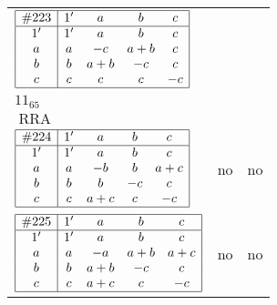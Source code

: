 \documentclass[12pt]{article}
\theoremstyle{definition}
\newcommand\RRA{\operatorname{RRA}}
\newcommand{\join}{\mathbin{+}}%
\newcommand{\id}{{1'}}%
\begin{document}
\begin{center}
\begin{longtable}{l|c|c}
$
\begin{array}{|c|cccc|} \hline
\#223 & \id & a & b & c \\ \hline
\id & \id & a & b & c \\
a & a & -c & a \join b & c \\
b & b & a \join b & -c & c \\
c & c & c & c & -c \\ \hline
\end{array}
$
 & \begin{tabular}{c} yes \\ $11_{65}$ \\ $\RRA$ \end{tabular} 
 & \adjustbox{valign=c, max height=1.6cm}{$
\left[ \begin{array}{cccccc}
\id & a & a & b & c & b \\ 
a & \id & a & a & c & b \\ 
a & a & \id & b & c & b \\ 
b & a & b & \id & c & b \\ 
c & c & c & c & \id & c \\ 
b & b & b & b & c & \id
\end{array}\right]
$}      \\[15mm]

$
\begin{array}{|c|cccc|} \hline
\#224 & \id & a & b & c \\ \hline
\id & \id & a & b & c \\
a & a & -b & b & a \join c \\
b & b & b & -c & c \\
c & c & a \join c & c & -c \\ \hline
\end{array}
$
 & no  
 & no     \\[15mm]

$
\begin{array}{|c|cccc|} \hline
\#225 & \id & a & b & c \\ \hline
\id & \id & a & b & c \\
a & a & -a & a \join b & a \join c \\
b & b & a \join b & -c & c \\
c & c & a \join c & c & -c \\ \hline
\end{array}
$
 & no  
 & no      \\[15mm]


\end{longtable}
\end{center}
\end{document}
